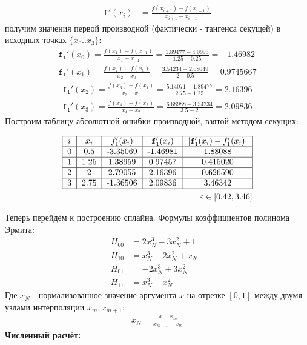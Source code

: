 \documentclass[a4paper, 14pt]{article}
\begin{document}
{\begin{align}
    \mathtt{f'}(x_i) &= \frac{f(x_{i+1})-f(x_{i-1})}{x_{i+1}-x_{i-1}}
\end{align}
получим значения первой производной (фактически - тангенса секущей) в исходных точках $\{x_0..x_3\}$:
\begin{align}
    \mathtt{f_1'}(x_0) = \frac{f(x_1)-f(x_{-1})}{x_1-x_{-1}}=\frac{1.89477-4.0995}{1.25+0.25}=-1.46982\\
    \mathtt{f_1'}(x_1) = \frac{f(x_2)-f(x_0)}{x_2-x_0}=\frac{3.54234-2.08049}{2-0.5}=0.9745667
\end{align}
\begin{align}
    \mathtt{f_1'}(x_2) = \frac{f(x_3)-f(x_1)}{x_3-x_1}=\frac{5.14071-1.89477}{2.75-1.25}=2.16396 \\
    \mathtt{f_1'}(x_3) = \frac{f(x_4)-f(x_2)}{x_4-x_2}=\frac{6.68988-3.54234}{3.5-2}= 2.09836
\end{align}
Построим таблицу абсолютной ошибки производной, взятой методом секущих:
\begin{center}
    \begin{align}
        \begin{tabular}{|c|c|c|c|c|}
            \hline
            $i$ & $x_i$ & $f_1'(x_i)$ & $\mathtt{f_1'}(x_i)$ & $|\mathtt{f_1'}(x_i)-f_1'(x_i)|$ \\
            \hline
            0 & 0.5 & -3.35069 & -1.46981 & 1.88088\\
            \hline
            1 &  1.25 & 1.38959 & 0.97457 &0.415020\\
            \hline
            2 &  2 &  2.79055 & 2.16396 &0.626590\\
            \hline
            3 &  2.75 & -1.36506 & 2.09836 &3.46342\\
            \hline
        \end{tabular}\\
\varepsilon\in[0.42, 3.46]
    \end{align}
\end{center}
\vspace{-0.5cm}
    Теперь перейдём к построению сплайна. Формулы коэффициентов полинома Эрмита:
\begin{align}
    H_{00} &= 2 x_N^3 - 3 x_N^2 + 1\\
    H_{10} &= x_N^3 - 2 x_N^2 + x_N\\
    H_{01} &= -2 x_N^3 + 3x_N^2\\
    H_{11} &= x_N^3 - x_N^2&
\end{align}
Где $x_N$ - нормализованное значение аргумента $x$ на отрезке $[0, 1]$ между двумя узлами интерполяции $x_m,x_{m+1}$:
\begin{align}
    x_N = \frac{x - x_m}{x_{m+1} - x_{m}}
\end{align}
\newpage
{\huge{\textbf{Численный расчёт:}}}

}
\end{document}
